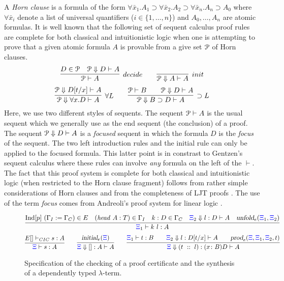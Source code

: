 A \emph{Horn clause} is a formula of the form $\forall \bar
x_1. A_1\supset \forall \bar x_2. A_2\supset \forall \bar
x_n. A_n\supset A_0$ where $\forall\bar x_i$ denote a list of
universal quantifiers ($i\in\{1,\ldots,n\}$) and $A_0,\ldots,A_n$ are
atomic formulas.  It is well known that the following set of sequent
calculus proof rules are complete for both classical and
intuitionistic logic when one is attempting to prove that a given
atomic formula $A$ is provable from a give set ${\mathcal P}$ of Horn
clauses. 
\[
  \infer[decide]{\Pscr\vdash A}{D \in \Pscr\quad \Pscr\Downarrow D\vdash A}
  \qquad
  \infer[init]{\Pscr\Downarrow A\vdash A}{}
\]
\[
  \infer[\forall L]{\Pscr\Downarrow\forall x. D\vdash A}
        {\Pscr\Downarrow D[t/x]\vdash A}
  \qquad
  \infer[\supset L]{\Pscr\Downarrow B\supset D\vdash A}
        {\Pscr\vdash B\qquad \Pscr\Downarrow D\vdash A}
\]
Here, we use two different styles of sequents.  The sequent
${\mathcal P}\vdash A$ is the usual sequent which we generally use as the end
sequent (the conclusion) of a proof.  The sequent ${\mathcal P}\Downarrow
D\vdash A$ is a \emph{focused} sequent in which the formula $D$ is the
\emph{focus} of the sequent.  The two left introduction rules and the
initial rule can only be applied to the focused formula.  This latter
point is in constrast to Gentzen's sequent calculus where these rules
can involve \emph{any} formula on the left of the $\vdash$.  The fact
that this proof system is complete for both classical and
intuitionistic logic (when restricted to the Horn clause fragment)
follows from rather simple considerations of Horn clauses
\cite{nadathur90jacm} and from the completeness of LJT proofs
\cite{Herbelin94}.  The use of the term \emph{focus} comes from
Andreoli's proof system for linear logic \cite{andreoli92jlc}.

\begin{figure}[t]
\[
\infer{\XXi_1\vdash k\ l : A}
      { \mathrm{Ind}[p] \ (\Gamma_I := \Gamma_C) \in E\quad 
       (\mathit{head} \ A : T)\in \Gamma_I\quad  
       k : D \in \Gamma_C\quad 
       \bc{\XXi_2}{} l D A \quad\unfoldExpert{\XXi_1}{\XXi_2}} 
\]
\vskip -18pt
\[
  \infer{\XXi\vdash  s : A}{{E[] \vdash_{CIC} s : A}}%
  \qquad
  \infer{\bc{\XXi}{}{[]} A A}{\initLExpert{\XXi}}
  \qquad
  \infer{\bc{\XXi}{}{(t\ ::\ l)}{\depprod{x}{B}{D}}{A}}
        {\XXi_1\vdash t : B\qquad
         \bc{\XXi_2}{}l {D[t/x]} A\qquad
         \prodE{\XXi}{\XXi_1}{\XXi_2}{t}}
\]
\caption{Specification of the checking of a proof certificate and the
  synthesis of a dependently typed $\lambda$-term.}
\label{fig:augmented}
\end{figure}


